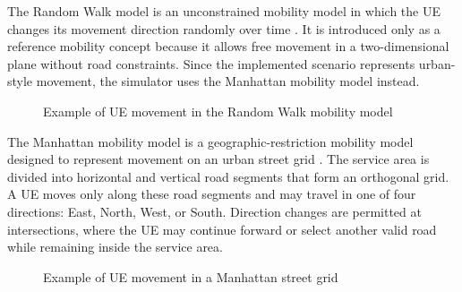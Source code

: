 The Random Walk model is an unconstrained mobility model in which the UE changes its movement direction randomly over time \cite{bai2003}. It is introduced only as a reference mobility concept because it allows free movement in a two-dimensional plane without road constraints. Since the implemented scenario represents urban-style movement, the simulator uses the Manhattan mobility model instead.

\begin{figure}[H]
\centering
{}
\caption{Example of UE movement in the Random Walk mobility model}
\label{fig:random-walk-mobility}
\end{figure}

The Manhattan mobility model is a geographic-restriction mobility model designed to represent movement on an urban street grid \cite{bai2003}. The service area is divided into horizontal and vertical road segments that form an orthogonal grid. A UE moves only along these road segments and may travel in one of four directions: East, North, West, or South. Direction changes are permitted at intersections, where the UE may continue forward or select another valid road while remaining inside the service area.

\begin{figure}[H]
\centering
{}
\caption{Example of UE movement in a Manhattan street grid}
\label{fig:manhattan-mobility}
\end{figure}


